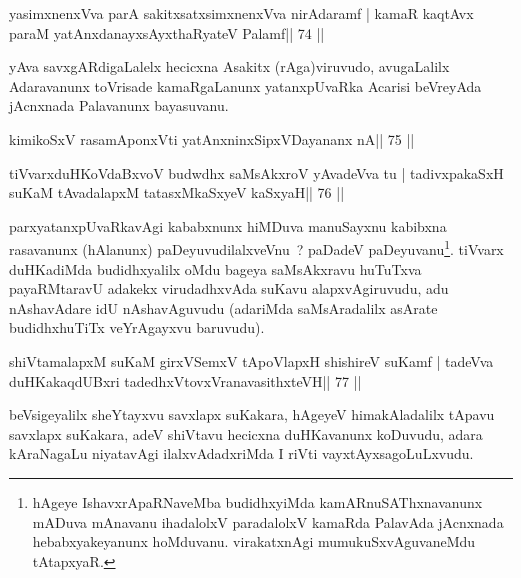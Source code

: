 \begin{shl}
yasimxnenxVva parA sakitxsatxsimxnenxVva nirAdaramf |
kamaR kaqtAvx paraM yatAnxdanayxsAyxthaRyateV Palamf\hfill || 74 ||
\end{shl}

\begin{artha}
yAva savxgARdigaLalelx hecicxna Asakitx (rAga)viruvudo, avugaLalilx Adaravanunx toVrisade kamaRgaLanunx yatanxpUvaRka Acarisi beVreyAda jAcnxnada Palavanunx bayasuvanu.
\end{artha}


\begin{shl}
kimikoSxV rasamAponxVti yatAnxninxSipxVDayananx nA\hfill || 75 ||
\end{shl}

\begin{shl}
tiVvarxduHKoVdaBxvoV budwdhx saMsAkxroV yAvadeVva tu |
tadivxpakaSxH suKaM tAvadalapxM tatasxMkaSxyeV kaSxyaH\hfill || 76 ||
\end{shl}

\begin{artha}
parxyatanxpUvaRkavAgi kababxnunx hiMDuva manuSayxnu kabibxna
rasavanunx (hAlanunx) paDeyuvudilalxveVnu~? paDadeV
paDeyuvanu\footnote[1]{hAgeye IshavxrApaRNaveMba budidhxyiMda
  kamARnuSAThxnavanunx mADuva mAnavanu ihadalolxV paradalolxV kamaRda
  PalavAda jAcnxnada hebabxyakeyanunx hoMduvanu. virakatxnAgi
  mumukuSxvAguvaneMdu tAtapxyaR.}. tiVvarx duHKadiMda budidhxyalilx
oMdu bageya saMsAkxravu huTuTxva payaRMtaravU adakekx virudadhxvAda
suKavu alapxvAgiruvudu, adu nAshavAdare idU nAshavAguvudu (adariMda
saMsAradalilx asArate budidhxhuTiTx veYrAgayxvu baruvudu).
\end{artha}


\begin{shl}
shiVtamalapxM suKaM girxVSemxV tApoV\s lapxH shishireV suKamf |
tadeVva duHKakaqdUBxri tadedhxVtovxVranavasithxteVH\hfill || 77 ||
\end{shl}

\begin{artha}
  beVsigeyalilx sheYtayxvu savxlapx suKakara, hAgeyeV himakAladalilx
  tApavu savxlapx suKakara, adeV shiVtavu hecicxna duHKavanunx
  koDuvudu, adara kAraNagaLu niyatavAgi ilalxvAdadxriMda I
  riVti vayxtAyxsagoLuLxvudu.
\end{artha}

